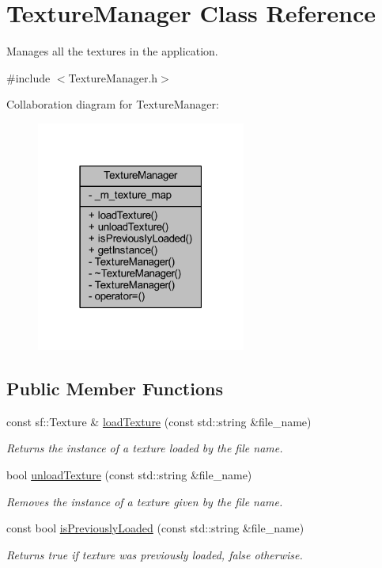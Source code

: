 \hypertarget{class_texture_manager}{\section{Texture\+Manager Class Reference}
\label{class_texture_manager}
}


Manages all the textures in the application.  




{\ttfamily \#include $<$Texture\+Manager.\+h$>$}



Collaboration diagram for Texture\+Manager\+:
\nopagebreak
\begin{figure}[H]
\begin{center}
\leavevmode
\includegraphics[width=195pt]{class_texture_manager__coll__graph}
\end{center}
\end{figure}
\subsection*{Public Member Functions}
\begin{DoxyCompactItemize}
\item 
const sf\+::\+Texture \& \hyperlink{class_texture_manager_aa631660b783d448a29b1096c64fe65e4}{load\+Texture} (const std\+::string \&file\+\_\+name)
\begin{DoxyCompactList}\small\item\em Returns the instance of a texture loaded by the file name. \end{DoxyCompactList}\item 
bool \hyperlink{class_texture_manager_a8a77e473313f9c07df6b76eafa5b5bd2}{unload\+Texture} (const std\+::string \&file\+\_\+name)
\begin{DoxyCompactList}\small\item\em Removes the instance of a texture given by the file name. \end{DoxyCompactList}\item 
const bool \hyperlink{class_texture_manager_a8ec1c28bde7e07f64d3e155add36c0df}{is\+Previously\+Loaded} (const std\+::string \&file\+\_\+name)
\begin{DoxyCompactList}\small\item\em Returns true if texture was previously loaded, false otherwise. \end{DoxyCompactList}\end{DoxyCompactItemize}
